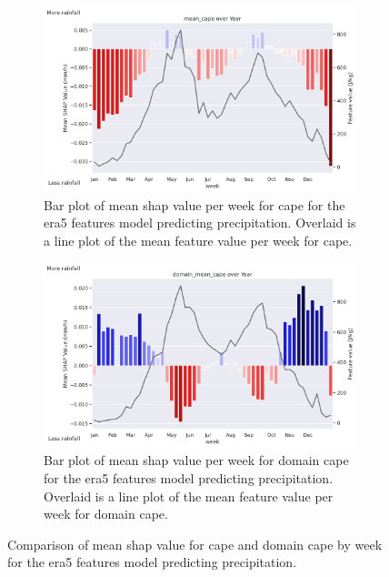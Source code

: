 \begin{figure}[ht]
    \centering
    \begin{subfigure}[t]{\textwidth}
        \centering
        \includegraphics[width=\textwidth]{../figures/generated/experiments/obs_precipitation/temporal_corr/obs_precipitation_era5_shap_mean_cape_by_week_over_year.png}
        \caption{Bar plot of mean \acrshort{shap} value per week for \acrshort{cape} for the \acrshort{era5} features model predicting precipitation. Overlaid is a line plot of the mean feature value per week for \acrshort{cape}.}
        \label{fig:obs_precipitation_era5_shap_mean_cape_by_week_over_year}
    \end{subfigure}
    \vspace{1em}
    \begin{subfigure}[t]{\textwidth}
        \centering
        \includegraphics[width=\textwidth]{../figures/generated/experiments/obs_precipitation/temporal_corr/obs_precipitation_era5_shap_domain_mean_cape_by_week_over_year.png}
        \caption{Bar plot of mean \acrshort{shap} value per week for domain \acrshort{cape} for the \acrshort{era5} features model predicting precipitation. Overlaid is a line plot of the mean feature value per week for domain \acrshort{cape}.}
        \label{fig:obs_precipitation_era5_shap_domain_mean_cape_by_week_over_year}
    \end{subfigure}
    \caption{Comparison of mean \acrshort{shap} value for \acrshort{cape} and domain \acrshort{cape} by week for the \acrshort{era5} features model predicting precipitation.}
    \label{fig:obs_precipitation_cape_by_week_over_year}
\end{figure}

